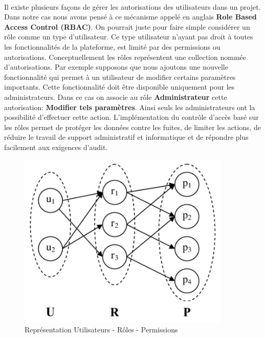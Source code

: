       \paragraph{}
      Il existe plusieurs façons de gérer les autorisations des utilisateurs dans un projet. Dans notre cas nous avons pens\'e \`a ce m\'ecanisme appel\'e en anglais \textbf{Role Based Access Control (RBAC)}. On pourrait juste pour faire simple  consid\'erer un rôle comme un type d'utilisateur. Ce type utilisateur n'ayant pas droit \`a toutes les fonctionnalit\'es de la plateforme, est limit\'e par des permissions ou autorisations. Conceptuellement les rôles représentent une collection nommée d'autorisations. Par exemple supposons que nous ajoutons une nouvelle fonctionnalité qui permet à un utilisateur de modifier certains paramètres importants. Cette fonctionnalité doit être disponible uniquement pour les administrateurs. Dans ce cas on associe au rôle \textbf{Administrateur} cette autorisation: \textbf{Modifier tels param\`etres}. Ainsi seuls les administrateurs ont la possibilit\'e d'effectuer cette action. L'implémentation du contrôle d'accès basé sur les rôles permet de protéger les données contre les fuites, de limiter les actions, de réduire le travail de support administratif et informatique et de répondre plus facilement aux exigences d'audit.
      
      \begin{figure}[H]
	  \begin{center}
	      \includegraphics[scale=0.6]{images/rbac.png}
	  \end{center}
	  \caption{Repr\'esentation Utilisateurs - R\^oles - Permissions}
	  \label{Page de la whitelist IP}
      \end{figure}
      
